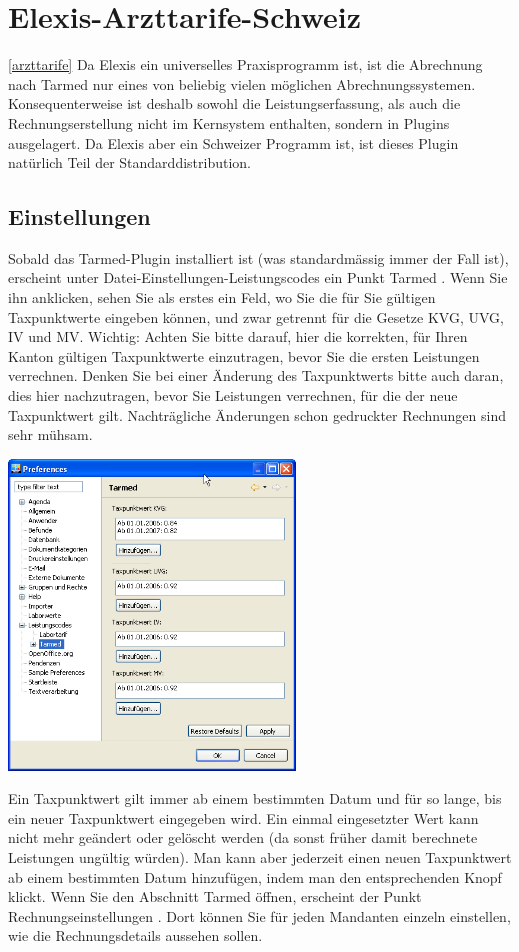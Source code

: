 \section{Elexis-Arzttarife-Schweiz}
\ref{arzttarife}
Da Elexis ein universelles Praxisprogramm ist, ist die Abrechnung nach Tarmed nur eines von beliebig vielen
möglichen Abrechnungssystemen. Konsequenterweise ist deshalb sowohl die Leistungserfassung, als auch die
Rechnungserstellung nicht im Kernsystem enthalten, sondern in Plugins ausgelagert.
Da Elexis aber ein Schweizer Programm ist, ist dieses Plugin natürlich Teil der
Standarddistribution.
\subsection{Einstellungen}
Sobald das Tarmed-Plugin installiert ist (was standardmässig immer der Fall ist), erscheint unter
Datei-Einstellungen-Leistungscodes ein Punkt  Tarmed . Wenn Sie ihn anklicken, sehen Sie als erstes ein Feld,
wo Sie die für Sie gültigen Taxpunktwerte eingeben können, und zwar getrennt für die Gesetze KVG, UVG, IV und MV.
Wichtig: Achten Sie bitte darauf, hier die korrekten, für Ihren Kanton gültigen Taxpunktwerte einzutragen,
bevor Sie die ersten Leistungen verrechnen. Denken Sie bei einer Änderung des Taxpunktwerts bitte auch daran,
dies hier nachzutragen, bevor Sie Leistungen verrechnen, für die der neue Taxpunktwert gilt. Nachträgliche
Änderungen schon gedruckter Rechnungen sind sehr mühsam.

\includegraphics[width=3in]{images/tarmed1.png}

Ein Taxpunktwert gilt immer ab einem bestimmten Datum und für so lange, bis ein neuer Taxpunktwert eingegeben
wird. Ein einmal eingesetzter Wert kann nicht mehr geändert oder gelöscht werden (da sonst früher damit berechnete
Leistungen ungültig würden). Man kann aber jederzeit einen neuen Taxpunktwert ab einem bestimmten Datum hinzufügen,
 indem man den entsprechenden Knopf klickt.
Wenn Sie den Abschnitt Tarmed öffnen, erscheint der Punkt  Rechnungseinstellungen . Dort können Sie für jeden
Mandanten einzeln einstellen, wie die Rechnungsdetails aussehen sollen.

